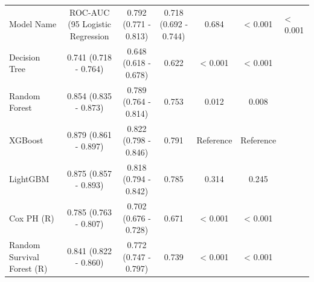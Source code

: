 \begin{tabular}{lccccc}
\toprule
Model Name & ROC-AUC (95%
\midrule
Logistic Regression & 0.792 (0.771 - 0.813) & 0.718 (0.692 - 0.744) & 0.684 & < 0.001 & < 0.001 \\
Decision Tree & 0.741 (0.718 - 0.764) & 0.648 (0.618 - 0.678) & 0.622 & < 0.001 & < 0.001 \\
Random Forest & 0.854 (0.835 - 0.873) & 0.789 (0.764 - 0.814) & 0.753 & 0.012 & 0.008 \\
XGBoost & 0.879 (0.861 - 0.897) & 0.822 (0.798 - 0.846) & 0.791 & Reference & Reference \\
LightGBM & 0.875 (0.857 - 0.893) & 0.818 (0.794 - 0.842) & 0.785 & 0.314 & 0.245 \\
Cox PH (R) & 0.785 (0.763 - 0.807) & 0.702 (0.676 - 0.728) & 0.671 & < 0.001 & < 0.001 \\
Random Survival Forest (R) & 0.841 (0.822 - 0.860) & 0.772 (0.747 - 0.797) & 0.739 & < 0.001 & < 0.001 \\
\bottomrule
\end{tabular}
